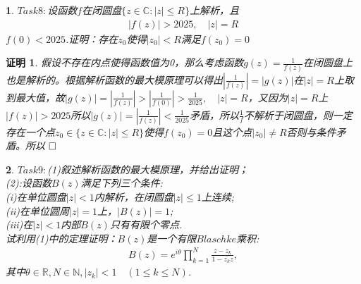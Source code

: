 \documentclass{ctexart}
\newcommand{\。}{．} %
\newenvironment{lanse}{
    \begin{tcolorbox}[breakable,enhanced, colback=qlan, boxrule=0pt, frame hidden,
        borderline west={0.7mm}{0.1mm}{slan}]
    }
    {\end{tcolorbox}}
\newenvironment{zise}{
    \begin{tcolorbox}[breakable,enhanced, colback=qzi, boxrule=0pt, frame hidden,
        borderline west={0.7mm}{0.1mm}{szi}]
    }
    {\end{tcolorbox}}
\theoremstyle{t} %
\newtheorem*{zmhj}{\color{slan} 证明}
\newtheorem*{smhj}{\color{slan} }
\newenvironment{zm}{\begin{lanse}\begin{zmhj}}{$\hfill \square$\end{zmhj}\end{lanse}}
\newenvironment{sm}{\begin{zise}\begin{smhj}}{\end{smhj}\end{zise}}
\begin{document}
\begin{sm}
    $Task8:$设函数$f$在闭圆盘$\{z\in\mathbb{C}:|z|\le R\}$上解析，且
    \begin{align*}
        |f(z)|>2025,\quad |z|=R
    \end{align*}
    $f(0)<2025$.证明：存在$z_0$使得$|z_0|<R$满足$f(z_0)=0$
\end{sm}
\begin{zm}
    假设不存在内点使得函数值为0，那么考虑函数$g(z)=\frac{1}{f(z)}$在闭圆盘上也是解析的。根据解析函数的最大模原理可以得出$\left|\frac{1}{f(z)}\right|=|g(z)|$在$|z|=R$上取到最大值，故$|g(z)|=\left|\frac{1}{f(z)}\right|>\left|\frac{1}{f(0)}\right|>\frac{1}{2025},\quad |z|=R$，又因为$|z|=R$上$|f(z)|>2025$所以$|g(z)|=\left|\frac{1}{f(z)}\right|<\frac{1}{2025}$矛盾，所以$\frac{1}{f}$不解析于闭圆盘，则一定存在一个点$z_0\in \{z\in\mathbb{C}:|z|\le R\}$使得$f(z_0)=0$且这个点$|z_0|\neq R$否则与条件矛盾。所以
\end{zm}
\begin{sm}
    $Task9:$(1)叙述解析函数的最大模原理，并给出证明；\\
    (2):设函数$B(z)$满足下列三个条件:\\
    (i)在单位圆盘$|z|<1$内解析，在闭圆盘$|z|\le 1$上连续;\\
    (ii)在单位圆周$|z|=1$上，$|B(z)|=1$;\\
    (iii)在$|z|<1$内部$B(z)$只有有限个零点.\\
    试利用(1)中的定理证明：$B(z)$是一个有限$Blaschke$乘积:
    \begin{align*}
        B(z)=e^{i\theta}\prod_{k=1}^{N}\frac{z-z_k}{1-\bar{z_k}z},
    \end{align*}
    其中$\theta\in\mathbb{R},N\in\mathbb{N},|z_k|<1\quad (1\le k\le N)$.
\end{sm}
\end{document}
